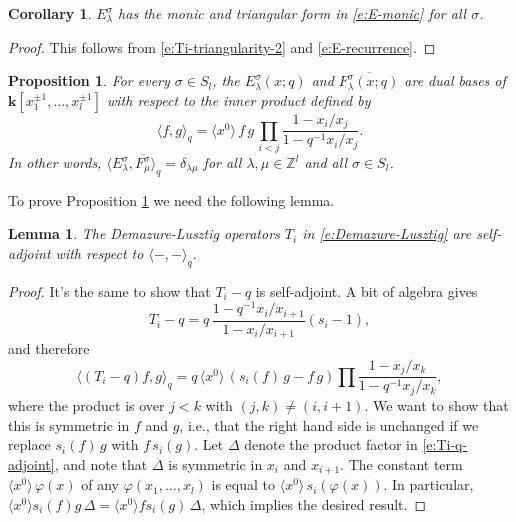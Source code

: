 \documentclass[12pt]{amsart}
\newtheorem{lemma}[thm]{Lemma}
\newtheorem{prop}[thm]{Proposition}
\newtheorem{cor}[thm]{Corollary}
\theoremstyle{definition}
\theoremstyle{remark}
\newcommand{\ZZ}{{\mathbb Z}}
\newcommand{\kk}{{\mathbf k}}
\begin{document}
\begin{cor}\label{cor:general-monic}
$E^{\sigma }_{\lambda }$ has the monic and triangular form in
\eqref{e:E-monic} for all $\sigma $.
\end{cor}

\begin{proof}
This follows from \eqref{e:Ti-triangularity-2} and \eqref{e:E-recurrence}.
\end{proof}

\begin{prop}\label{prop:twist-orthogonality}
For every $\sigma \in S_{l}$, the $E_{\lambda }^{\sigma }(x;q)$ and
$\overline{F_{\lambda }^{\sigma }(x;q)}$ are dual bases of $\kk
[x_{1}^{\pm 1},\ldots,x_{l}^{\pm 1}]$ with respect to the inner
product defined by
\begin{equation}\label{e:HL-inner}
\langle f,g \rangle_{q} = \langle x^{0} \rangle\, f\, g\, \prod _{i<j}
\frac{1-x_{i}/x_{j}}{1 - q^{-1} x_{i}/x_{j}}.
\end{equation}
In other words, $\langle E_{\lambda }^{\sigma }, \overline{F_{\mu
}^{\sigma }} \rangle _{q} = \delta _{\lambda \mu }$ for all $\lambda
,\mu \in \ZZ ^{l}$ and all $\sigma \in S_{l}$.
\end{prop}

To prove Proposition \ref{prop:twist-orthogonality} we need the
following lemma.

\begin{lemma}\label{lem:Ti-self-adjoint}
The Demazure-Lusztig operators $T_{i}$ in \eqref{e:Demazure-Lusztig}
are self-adjoint with respect to $\langle -,- \rangle_{q}$.
\end{lemma}

\begin{proof}
It's the same to show that $T_{i}-q$ is self-adjoint.  A bit of
algebra gives
\begin{equation}\label{e:Ti-q}
T_{i}-q =q\, \frac{1-q^{-1} x_{i}/x_{i+1}}{1-x_{i}/x_{i+1}}(s_{i}-1),
\end{equation}
and therefore
\begin{equation}\label{e:Ti-q-adjoint}
\langle (T_{i}-q)f,g \rangle_{q} = q\, \langle x^{0} \rangle\,
(s_{i}(f)\, g-f\, g) \prod \frac{1-x_{j}/x_{k}}{1-q^{-1}x_{j}/x_{k}},
\end{equation}
where the product is over $j<k$ with $(j,k) \not = (i,i+1)$.  We want
to show that this is symmetric in $f$ and $g$, i.e., that the right
hand side is unchanged if we replace $s_{i}(f)\, g$ with $f\,
s_{i}(g)$.  Let $\Delta $ denote the product factor in
\eqref{e:Ti-q-adjoint}, and note that $\Delta $ is symmetric in
$x_{i}$ and $x_{i+1}$.  The constant term $\langle x^{0} \rangle\,
\varphi (x)$ of any $\varphi (x_{1}, \ldots, x_{l})$ is equal to
$\langle x^{0} \rangle\, s_{i} (\varphi (x))$.  In particular,
$\langle x^{0} \rangle s_{i}(f) g\, \Delta = \langle x^{0} \rangle f
s_{i}(g)\, \Delta $, which implies the desired result.
\end{proof}
\end{document}
